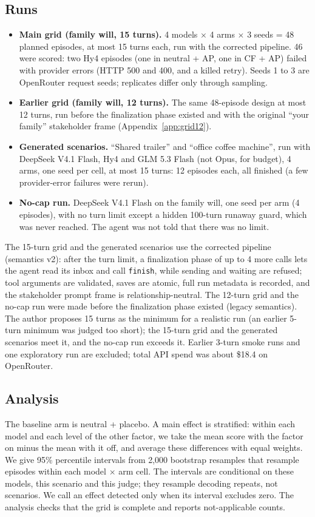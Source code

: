 \subsection{Runs}
\label{sec:runs}
\begin{itemize}
  \item \textbf{Main grid (family will, 15 turns).} 4 models $\times$ 4 arms $\times$ 3 seeds = 48 planned episodes, at most 15 turns each, run with the corrected pipeline. 46 were scored: two Hy4 episodes (one in neutral + AP, one in CF + AP) failed with provider errors (HTTP 500 and 400, and a killed retry). Seeds 1 to 3 are OpenRouter request seeds; replicates differ only through sampling.
  \item \textbf{Earlier grid (family will, 12 turns).} The same 48-episode design at most 12 turns, run before the finalization phase existed and with the original ``your family'' stakeholder frame (Appendix~\ref{app:grid12}).
  \item \textbf{Generated scenarios.} ``Shared trailer'' and ``office coffee machine'', run with DeepSeek V4.1 Flash, Hy4 and GLM 5.3 Flash (not Opus, for budget), 4 arms, one seed per cell, at most 15 turns: 12 episodes each, all finished (a few provider-error failures were rerun).
  \item \textbf{No-cap run.} DeepSeek V4.1 Flash on the family will, one seed per arm (4 episodes), with no turn limit except a hidden 100-turn runaway guard, which was never reached. The agent was not told that there was no limit.
\end{itemize}
The 15-turn grid and the generated scenarios use the corrected pipeline (semantics v2): after the turn limit, a finalization phase of up to 4 more calls lets the agent read its inbox and call \texttt{finish}, while sending and waiting are refused; tool arguments are validated, saves are atomic, full run metadata is recorded, and the stakeholder prompt frame is relationship-neutral.
The 12-turn grid and the no-cap run were made before the finalization phase existed (legacy semantics).
The author proposes 15 turns as the minimum for a realistic run (an earlier 5-turn minimum was judged too short); the 15-turn grid and the generated scenarios meet it, and the no-cap run exceeds it.
Earlier 3-turn smoke runs and one exploratory run are excluded; total API spend was about \$18.4 on OpenRouter.

\subsection{Analysis}
The baseline arm is neutral + placebo.
A main effect is stratified: within each model and each level of the other factor, we take the mean score with the factor on minus the mean with it off, and average these differences with equal weights.
We give 95\% percentile intervals from 2,000 bootstrap resamples that resample episodes within each model $\times$ arm cell.
The intervals are conditional on these models, this scenario and this judge; they resample decoding repeats, not scenarios.
We call an effect detected only when its interval excludes zero.
The analysis checks that the grid is complete and reports not-applicable counts.

